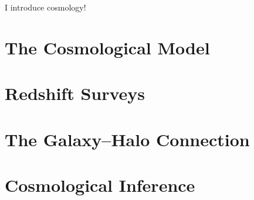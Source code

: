I introduce cosmology!

\section{The Cosmological Model}


\section{Redshift Surveys}


\section{The Galaxy--Halo Connection}


\section{Cosmological Inference}


